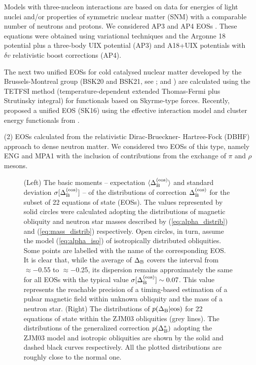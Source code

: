 \documentclass[fleqn,usenatbib]{mnras}
\begin{document}
Models with three-nucleon interactions are based on data for energies of light nuclei and/or properties of symmetric nuclear matter (SNM) with a comparable number of neutrons and protons.
We considered AP3 and AP4 EOSs  \citep{APR}. These equations were obtained using variational
techniques and the Argonne 18 potential plus a three-body UIX
potential (AP3) and A18+UIX potentials with $\delta v$ relativistic boost
corrections (AP4).



The next two unified EOSs for cold catalysed nuclear matter developed by the Brussels-Montreal group (BSK20 and BSK21, see
\cite{BSKEOS}; \cite{BSKEOS-1} and \cite{BSKEOS-2}) are calculated using the TETFSI method
(temperature-dependent extended Thomas-Fermi plus Strutinsky
integral) for functionals based on Skyrme-type forces. Recently,
\cite{SK16} proposed a unified EOS (SK16) using
the effective interaction model and cluster energy functionals from
\cite{SK16-1, SK16-2}.

(2) EOSs calculated from the relativistic Dirac-Brueckner-
Hartree-Fock (DBHF) approach to dense neutron matter. We considered two EOSs of this type, namely ENG \citep{ENG}
and MPA1 \citep{MPA} with the inclusion
of contributions from the exchange of $\pi$ and $\rho$ mesons.


\begin{figure*}
    {\centering
    \par}
    \caption{(Left) The basic moments -- expectation $\langle \Delta^{\rm (eos)}_{\rm B} \rangle$ and standard deviation $\sigma[\Delta^{\rm (eos)}_{\rm
B}]$ -- of the distributions of correction $\Delta^{\rm (eos)}_{\rm B}$ for the subset of 22 equations of state (EOSs). The values represented by solid circles 
were calculated adopting the distributions of magnetic obliquity and neutron star masses described by (\ref{eq:alpha_distrib}) and (\ref{eq:mass_distrib}) 
respectively. Open circles, in turn, assume the model (\ref{eq:alpha_iso}) of isotropically distributed obliquities. Some points are labelled with the
name of the corresponding EOS. It is clear that, while the average of $\Delta_{\rm B}$ covers the interval from $\approx -$0.55 to $\approx -$0.25, its dispersion 
remains approximately the same for all EOSs with the typical value $\sigma[\Delta^{\rm(eos)}_{\rm B}] \sim 0.07$. This value represents the reachable precision 
of a timing-based estimation of a pulsar magnetic field within unknown obliquity and the mass of a neutron star. (Right) The distributions of 
$p(\Delta_{\rm B}\vert{\rm eos})$ for 22 equations of state within the ZJM03 obliquities (grey lines). The distributions of the generalized correction 
$p(\Delta^*_{\rm B})$ adopting the ZJM03 model and isotropic obliquities are shown by the solid and dashed black curves respectively. All the plotted 
distributions are roughly close to the normal one.}
    \label{fig:delta_distribs}
\end{figure*}
\end{document}
